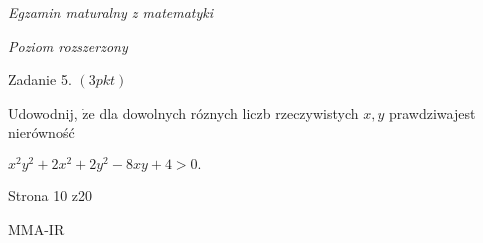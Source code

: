 \documentclass[a4paper,12pt]{article}
\begin{document}
{\it Egzamin maturalny z matematyki}

{\it Poziom rozszerzony}

Zadanie 5. $(3pkt)$

Udowodnij, $\dot{\mathrm{z}}\mathrm{e}$ dla dowolnych róznych liczb rzeczywistych $x, y$ prawdziwajest nierówność

$x^{2}y^{2}+2x^{2}+2y^{2}-8xy+4>0.$

Strona 10 z20

MMA-IR
\end{document}
